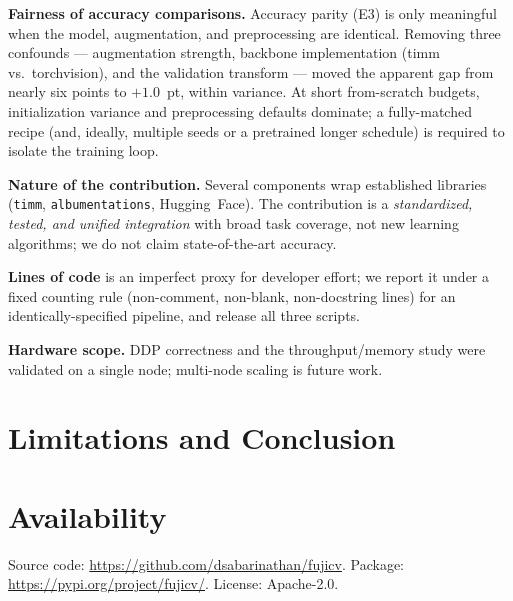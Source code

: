 \documentclass[11pt]{article}
\begin{document}
\textbf{Fairness of accuracy comparisons.} Accuracy parity (E3) is only
meaningful when the model, augmentation, and preprocessing are identical.
Removing three confounds --- augmentation strength, backbone implementation
(timm vs.\ torchvision), and the validation transform --- moved the apparent gap
from nearly six points to $+1.0$~pt, within variance. At short from-scratch
budgets, initialization variance and preprocessing defaults dominate; a
fully-matched recipe (and, ideally, multiple seeds or a pretrained longer
schedule) is required to isolate the training loop.

\textbf{Nature of the contribution.} Several components wrap established
libraries (\texttt{timm}, \texttt{albumentations}, Hugging~Face). The
contribution is a \emph{standardized, tested, and unified integration} with
broad task coverage, not new learning algorithms; we do not claim
state-of-the-art accuracy.

\textbf{Lines of code} is an imperfect proxy for developer effort; we report it
under a fixed counting rule (non-comment, non-blank, non-docstring lines) for an
identically-specified pipeline, and release all three scripts.

\textbf{Hardware scope.} DDP correctness and the throughput/memory study were
validated on a single node; multi-node scaling is future work.

\section{Limitations and Conclusion}
\label{sec:conclusion}

\section*{Availability}
Source code: \url{https://github.com/dsabarinathan/fujicv}. Package:
\url{https://pypi.org/project/fujicv/}. License: Apache-2.0.



\end{document}
